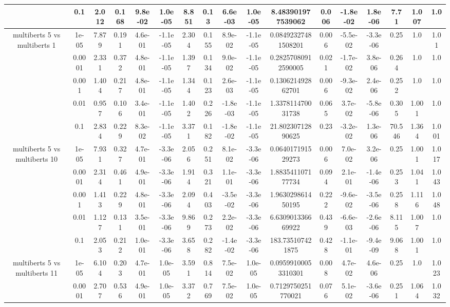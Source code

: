 \begin{tabular}{|c|c|c|c|c|c|c|c|c|c|c|c|c|c|c|c|c|}
 & 0.1 & 2.012 & 0.168 & 9.8e-02 & 1.0e-05 & 8.851 & 0.13 & 6.6e-03 & 1.0e-05 & 8.483901977539062 & 0.006 & -1.8e-02 & 1.8e-06 & 7.71 & 1.007 & 1.0 \\
\hline
\multirow{5}{*}{multiberts 5 vs multiberts 1} & 1e-05 & 7.879 & 0.191 & 4.6e-01 & -1.1e-05 & 2.304 & 0.155 & 8.9e-02 & -1.1e-05 & 0.08492327481508201 & 0.006 & -5.5e-02 & -3.3e-06 & 0.25 & 1.0 & 1.01 \\
 & 0.0001 & 2.331 & 0.372 & 4.8e-01 & -1.1e-05 & 1.397 & 0.134 & 9.0e-02 & -1.1e-05 & 0.28257080912590005 & 0.021 & -1.7e-02 & 3.8e-06 & 0.264 & 1.0 & 1.0 \\
 & 0.001 & 1.404 & 0.217 & 4.8e-01 & -1.1e-05 & 1.344 & 0.123 & 2.6e-03 & -1.1e-05 & 0.130621492862701 & 0.006 & -9.3e-02 & 2.4e-06 & 0.252 & 1.0 & 1.0 \\
 & 0.01 & 0.957 & 0.106 & 3.4e-01 & -1.1e-05 & 1.402 & 0.226 & -1.8e-03 & -1.1e-05 & 1.337811470031738 & 0.065 & 3.7e-02 & -5.8e-06 & 0.305 & 1.001 & 1.0 \\
 & 0.1 & 2.834 & 0.229 & 8.3e-02 & -1.1e-05 & 3.371 & 0.182 & -1.8e-02 & -1.1e-05 & 21.80230712890625 & 0.23 & -3.2e-02 & 1.3e-06 & 70.546 & 1.364 & 1.001 \\
\hline
\multirow{5}{*}{multiberts 5 vs multiberts 10} & 1e-05 & 7.931 & 0.327 & 4.7e-01 & -3.3e-06 & 2.056 & 0.251 & 8.1e-02 & -3.3e-06 & 0.064017191529273 & 0.006 & 7.0e-02 & 3.2e-06 & 0.25 & 1.001 & 1.017 \\
 & 0.0001 & 2.314 & 0.461 & 4.9e-01 & -3.3e-06 & 1.914 & 0.321 & 1.1e-01 & -3.3e-06 & 1.883541107177734 & 0.094 & 2.1e-01 & -1.4e-06 & 0.253 & 1.041 & 1.043 \\
 & 0.001 & 1.413 & 0.229 & 4.8e-01 & -3.3e-06 & 2.094 & 0.403 & -3.5e-02 & -3.3e-06 & 1.963029861450195 & 0.222 & -9.6e-02 & -3.5e-06 & 0.258 & 1.116 & 1.048 \\
 & 0.01 & 1.127 & 0.131 & 3.5e-01 & -3.3e-06 & 9.869 & 0.273 & 2.2e-02 & -3.3e-06 & 6.630901336669922 & 0.439 & -6.6e-03 & -2.6e-06 & 8.115 & 1.007 & 1.0 \\
 & 0.1 & 2.053 & 0.212 & 1.0e-01 & -3.3e-06 & 3.658 & 0.282 & -1.4e-02 & -3.3e-06 & 183.735107421875 & 0.428 & -1.1e-01 & -9.4e-09 & 9.068 & 1.001 & 1.0 \\
\hline
\multirow{5}{*}{multiberts 5 vs multiberts 11} & 1e-05 & 6.104 & 0.203 & 4.7e-01 & 1.0e-05 & 3.591 & 0.814 & 7.5e-02 & 1.0e-05 & 0.09599100053310301 & 0.008 & 4.7e-02 & 4.6e-06 & 0.25 & 1.0 & 1.023 \\
 & 0.0001 & 2.707 & 0.536 & 4.9e-01 & 1.0e-05 & 3.372 & 0.769 & 7.5e-02 & 1.0e-05 & 0.7129750251770021 & 0.076 & 5.1e-02 & -3.6e-06 & 0.251 & 1.064 & 1.032 \\

\end{tabular}
